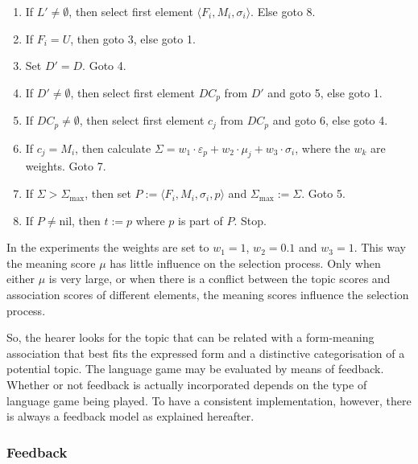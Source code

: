 \begin{enumerate}

\item If $L' \neq \emptyset$, then select first element $\langle F_i,M_i,\sigma_i \rangle$. Else goto 8.

\item If $F_i=U$, then goto 3, else goto 1.

\item Set $D'=D$. Goto 4.

\item If $D' \neq \emptyset$, then select first element $DC_p$ from $D'$ and goto 5, else goto 1.

\item If $DC_p \neq \emptyset$, then select first element $c_j$ from $DC_p$ and goto 6, else goto 4.

\item If $c_j=M_i$, then calculate $\Sigma = w_1 \cdot \varepsilon_p + w_2 \cdot \mu_j + w_3 \cdot \sigma_i$, where the $w_k$ are weights. Goto 7.

\item If $\Sigma > \Sigma_{\mbox{max}}$, then set $P:=\langle F_i,M_i,\sigma_i,p \rangle$ and $\Sigma_{\mbox{max}}:=\Sigma$. Goto 5.

\item If $P \neq \mbox{nil}$, then $t:=p$ where $p$ is part of $P$. Stop.

\end{enumerate}


In the experiments the weights are set to $w_1=1$, $w_2=0.1$ and $w_3=1$. This way the meaning score $\mu$ has little influence on the selection process. Only when either $\mu$ is very large, or when there is a conflict between the topic scores and association scores of different elements, the meaning scores influence the selection process.

So, the hearer looks for the topic that can be related with a form-meaning association that best fits the expressed form and a distinctive categorisation of a potential topic. The language game may be evaluated by means of feedback. Whether or not feedback is actually incorporated depends on the type of language game being played. To have a consistent implementation, however, there is always a feedback model as explained hereafter.

\subsubsection{Feedback}\label{s:cm:feedback}

